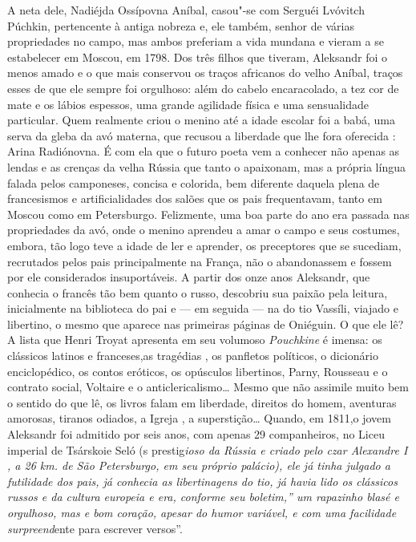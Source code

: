 A neta dele, Nadiéjda Ossípovna Aníbal, casou"-se com Serguéi Lvóvitch
Púchkin, pertencente à antiga nobreza e, ele também, senhor de várias
propriedades no campo, mas ambos preferiam a vida mundana e vieram a se
estabelecer em Moscou, em 1798. Dos três filhos que tiveram, Aleksandr
foi o menos amado e o que mais conservou os traços africanos do velho
Aníbal, traços esses de que ele sempre foi orgulhoso: além do cabelo
encaracolado, a tez cor de mate e os lábios espessos, uma grande
agilidade física e uma sensualidade particular. Quem realmente criou o
menino até a idade escolar foi a babá, uma serva da gleba da avó
materna, que recusou a liberdade que lhe fora oferecida : Arina
Radiónovna. É com ela que o futuro poeta vem a conhecer não apenas as
lendas e as crenças da velha Rússia que tanto o apaixonam, mas a própria
língua falada pelos camponeses, concisa e colorida, bem diferente
daquela plena de francesismos e artificialidades dos salões que os pais
frequentavam, tanto em Moscou como em Petersburgo. Felizmente, uma boa
parte do ano era passada nas propriedades da avó, onde o menino aprendeu
a amar o campo e seus costumes, embora, tão logo teve a idade de ler e
aprender, os preceptores que se sucediam, recrutados pelos pais
principalmente na França, não o abandonassem e fossem por ele
considerados insuportáveis. A partir dos onze anos Aleksandr, que
conhecia o francês tão bem quanto o russo, descobriu sua paixão pela
leitura, inicialmente na biblioteca do pai e --- em seguida --- na do tio
Vassíli, viajado e libertino, o mesmo que aparece nas primeiras páginas
de Oniéguin. O que ele lê? A lista que Henri Troyat apresenta em seu
volumoso \emph{Pouchkine} é imensa: os clássicos latinos e franceses,as
tragédias , os panfletos políticos, o dicionário enciclopédico, os
contos eróticos, os opúsculos libertinos, Parny, Rousseau e o contrato
social, Voltaire e o anticlericalismo\ldots{} Mesmo que não assimile muito
bem o sentido do que lê, os livros falam em liberdade, direitos do
homem, aventuras amorosas, tiranos odiados, a Igreja , a superstição\ldots{}
Quando, em 1811,o jovem Aleksandr foi admitido por seis anos, com apenas
29 companheiros, no Liceu imperial de Tsárskoie Seló (s
prestig\emph{ioso da Rússia e criado pelo czar Alexandre I , a 26 km. de São
Petersburgo, em seu próprio palácio), ele já tinha julgado a futilidade
dos pais, já conhecia as libertinagens do tio, já havia lido os
clássicos russos e da cultura europeia e era, conforme seu boletim,'' um
rapazinho \emph{blasé} e orgulhoso, mas e bom coração, apesar do humor
variável, e com uma facilidade surpreend}ente para escrever versos''.
